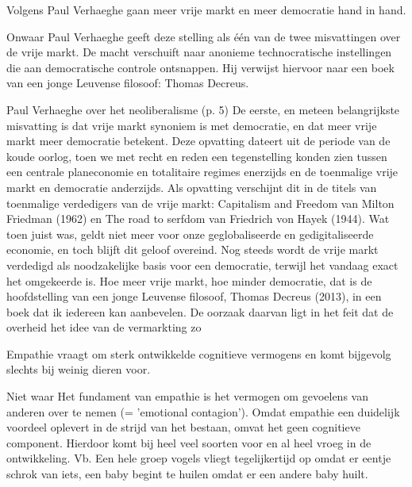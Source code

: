 \documentclass[main.tex]{subfiles}
\begin{document}
\begin{examenvraag}
    \begin{stelling}
        Volgens Paul Verhaeghe gaan meer vrije markt en meer democratie hand in hand.
    \end{stelling}

    \begin{stelling-antwoord}{Onwaar}
        Paul Verhaeghe geeft deze stelling als \'e\'en van de twee misvattingen over de vrije markt.
        De macht verschuift naar anonieme technocratische instellingen die aan democratische
        controle ontsnappen.
        Hij verwijst hiervoor naar een boek van een jonge Leuvense filosoof: Thomas Decreus.
        \begin{citaat}{Paul Verhaeghe over het neoliberalisme (p. 5)}
            De eerste, en meteen belangrijkste misvatting is dat vrije markt synoniem is met democratie, en dat meer vrije markt meer democratie betekent.
            Deze opvatting dateert uit de periode van de koude oorlog, toen we met recht en reden een tegenstelling konden zien tussen een centrale planeconomie en totalitaire regimes enerzijds en de toenmalige vrije markt en democratie anderzijds.
            Als opvatting verschijnt dit in de titels van toenmalige verdedigers van de vrije markt: Capitalism and Freedom van Milton Friedman (1962) en The road to serfdom van Friedrich von Hayek (1944).
            Wat toen juist was, geldt niet meer voor onze geglobaliseerde en gedigitaliseerde economie, en toch blijft dit geloof overeind.
            Nog steeds wordt de vrije markt verdedigd als noodzakelijke basis voor een democratie, terwijl het vandaag exact het omgekeerde is.
            Hoe meer vrije markt, hoe minder democratie, dat is de hoofdstelling van een jonge Leuvense filosoof, Thomas Decreus (2013), in een boek dat ik iedereen kan aanbevelen.
            De oorzaak daarvan ligt in het feit dat de overheid het idee van de vermarkting zo
        \end{citaat}
    \end{stelling-antwoord}
\end{examenvraag}


\begin{examenvraag}
    \begin{stelling}
        Empathie vraagt om sterk ontwikkelde cognitieve vermogens en komt bijgevolg slechts bij weinig dieren voor.
    \end{stelling}

    \begin{stelling-antwoord}{Niet waar}
    Het fundament van empathie is het vermogen om gevoelens van anderen over te nemen (= 'emotional contagion').‭ ‬Omdat 
    empathie een duidelijk voordeel oplevert in de strijd van het bestaan,‭ ‬omvat het geen 
    cognitieve component.‭ ‬Hierdoor komt bij heel veel soorten voor en al heel vroeg in de 
    ontwikkeling.‭ ‬Vb.‭ ‬Een hele groep vogels vliegt tegelijkertijd op omdat er‭ ‬eentje schrok van 
    iets,‭ ‬een baby begint te huilen omdat er een andere baby huilt.
    \end{stelling-antwoord}
\end{examenvraag}
\end{document}
